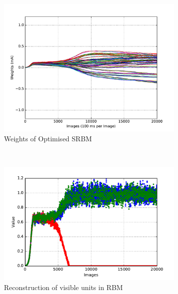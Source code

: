 \begin{figure}
\begin{subfigure}[t]{0.32\textwidth}
		\includegraphics[width=\textwidth]{pics_sdlm/17_exp_SRBM_all_long/exp3_weights_s.pdf}
		\caption{Weights of Optimised SRBM}
	\end{subfigure}\\
	\begin{subfigure}[t]{0.32\textwidth}
		\includegraphics[width=\textwidth]{pics_sdlm/31_exp_RBM_noise/exp3_recon_s2.pdf}
		\caption{Reconstruction of visible units in RBM}
	\end{subfigure}
	\begin{subfigure}[t]{0.32\textwidth}

\end{subfigure}
\end{figure}
